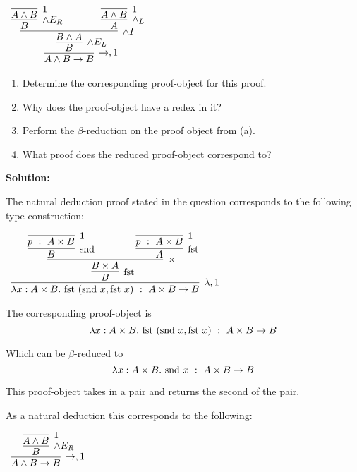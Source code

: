 \documentclass[11pt]{report}
\begin{document}
\begin{enumerate}
	\begin{center}
		$\begin{array}{c}		
		  \infer[\to, 1]{A \land B \to B}
		  	{\infer[\land E_{L}]{B}
				{\infer[\land I]{B \land A}
					{\infer[\land E_{R}]{B}{\infer[1]{A \land B}{}} 
					\hspace{0.5cm}	&	\hspace{0.5cm}
					\infer[\land_{L}]{A}{\infer[1]{A \land B}{}}}}}
		\end{array}$
	  \end{center}

	  	\begin{enumerate}
			\item Determine the corresponding proof-object for this proof. 
			\item Why does the proof-object have a redex in it? 
			\item Perform the $\beta$-reduction on the proof object from (a).
			\item What proof does the reduced proof-object correspond to?
		\end{enumerate}

		{\bf Solution:}

		The natural deduction proof stated in the question corresponds to the following type construction:

		\begin{center}
			$\begin{array}{c}		
				\infer[\lambda, 1]{\lambda x : A \times B. \ \fst (\snd x, \fst x) \ : \ A \times B \to B}
					{\infer[\fst]{B}
					{\infer[\times]{B \times A}
						{\infer[\snd]{B}{\infer[1]{p \ : \ A \times B}{}} 
						\hspace{0.5cm}	&	\hspace{0.5cm}
						\infer[\fst]{A}{\infer[1]{p \ : \ A \times B}{}}}}}
			\end{array}$
		\end{center}

		The corresponding proof-object is $$\lambda x : A \times B. \ \fst (\snd x, \fst x) \ : \ A \times B \to B$$

		Which can be $\beta$-reduced to $$\lambda x : A \times B. \ \text{snd } x \ : \ A \times B \to B$$

		This proof-object takes in a pair and returns the second of the pair. 
		
		As a natural deduction this corresponds to the following: 

		\begin{center}
			$\begin{array}{c}		
				\infer[\to, 1]{A \land B \to B}
					{\infer[\land E_{R}]{B}
						{\infer[1]{A \land B}
							{}}}
			\end{array}$
		\end{center}


\end{enumerate}
\end{document}

